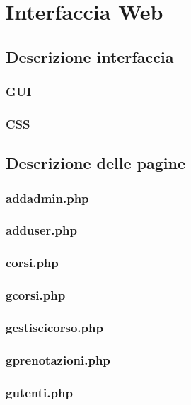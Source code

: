 \chapter{Interfaccia Web} 

\section{Descrizione interfaccia}

\subsection{GUI}
\subsection{CSS}

\section{Descrizione delle pagine}

\subsection{addadmin.php}

\subsection{adduser.php}

\subsection{corsi.php}

\subsection{gcorsi.php}

\subsection{gestiscicorso.php}

\subsection{gprenotazioni.php}

\subsection{gutenti.php}

